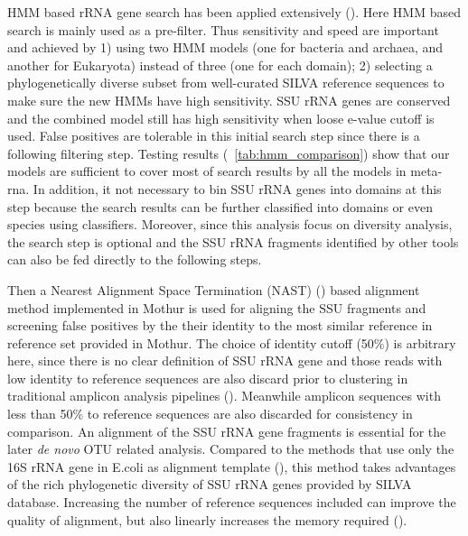 \documentclass[12pt]{article}
\begin{document}
HMM based rRNA gene search has been applied extensively
(\cite{metarna,rrnaselector,metaxa}). Here HMM based search is mainly
used as a pre-filter. Thus sensitivity and speed are important and
achieved by 1) using two HMM models (one for bacteria and archaea, and
another for Eukaryota) instead of three (one for each domain); 2)
selecting a phylogenetically diverse subset from well-curated SILVA
reference sequences to make sure the new HMMs have high
sensitivity. SSU rRNA genes are conserved and the combined model still
has high sensitivity when loose e-value cutoff is used. False
positives are tolerable in this initial search step since there is a
following filtering step. Testing results (~\ref{tab:hmm_comparison})
show that our models are sufficient to cover most of search results by
all the models in meta-rna. In addition, it not necessary to bin SSU
rRNA genes into domains at this step because the search results can be
further classified into domains or even species using
classifiers. Moreover, since this analysis focus on diversity
analysis, the search step is optional and the SSU rRNA fragments
identified by other tools can also be fed directly to the following
steps.

Then a Nearest Alignment Space Termination (NAST)
(\cite{mothuraligner2009}) based alignment method implemented in
Mothur is used for aligning the SSU fragments and screening false
positives by the their identity to the most similar reference in
reference set provided in Mothur. The choice of identity cutoff (50\%)
is arbitrary here, since there is no clear definition of SSU rRNA gene
and those reads with low identity to reference sequences are also
discard prior to clustering in traditional amplicon analysis pipelines
(\cite{rdp2009, mothur, qiime}). Meanwhile amplicon sequences with
less than 50\% to reference sequences are also discarded for
consistency in comparison. An alignment of the SSU rRNA gene fragments
is essential for the later {\em de novo} OTU related
analysis. Compared to the methods that use only the 16S rRNA gene in
E.coli as alignment template (\cite{kostas2013}), this method takes
advantages of the rich phylogenetic diversity of SSU rRNA genes
provided by SILVA database. Increasing the number of reference
sequences included can improve the quality of alignment, but also
linearly increases the memory required
(\cite{mothuraligner2009,pynast}).
\end{document}
